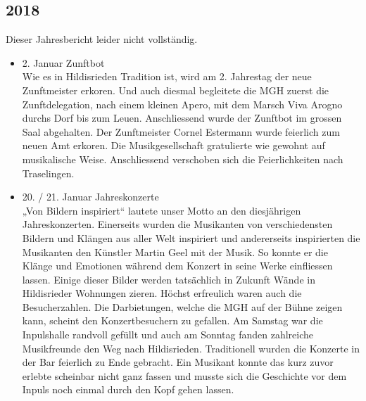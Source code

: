 \subsection*{2018}
\begin{history}

      Dieser Jahresbericht leider nicht vollständig.

      \begin{itemize}

            \item 2. Januar Zunftbot\\
                  Wie es in Hildisrieden Tradition ist, wird am 2. Jahrestag der
                  neue Zunftmeister erkoren.  Und auch diesmal begleitete die MGH
                  zuerst die Zunftdelegation, nach einem kleinen Apero, mit dem
                  Marsch Viva Arogno durchs Dorf bis zum Leuen. Anschliessend wurde
                  der Zunftbot im grossen Saal abgehalten. Der Zunftmeister Cornel
                  Estermann wurde feierlich zum neuen Amt erkoren. Die
                  Musikgesellschaft gratulierte wie gewohnt auf musikalische Weise.
                  Anschliessend verschoben sich die Feierlichkeiten nach
                  Traselingen.

            \item 20. / 21. Januar Jahreskonzerte\\
                  „Von Bildern inspiriert“ lautete unser Motto an den diesjährigen
                  Jahreskonzerten. Einerseits wurden die Musikanten von
                  verschiedensten Bildern und Klängen aus aller Welt inspiriert und
                  andererseits inspirierten die Musikanten den Künstler Martin Geel
                  mit der Musik. So konnte er die Klänge und Emotionen während dem
                  Konzert in seine Werke einfliessen lassen. Einige dieser Bilder
                  werden tatsächlich in Zukunft Wände in Hildisrieder Wohnungen
                  zieren. Höchst erfreulich waren auch die Besucherzahlen. Die
                  Darbietungen, welche die MGH auf der Bühne zeigen kann, scheint
                  den Konzertbesuchern zu gefallen. Am Samstag war die Inpulshalle
                  randvoll gefüllt und auch am Sonntag fanden zahlreiche
                  Musikfreunde den Weg nach Hildisrieden. Traditionell wurden die
                  Konzerte in der Bar feierlich zu Ende gebracht. Ein Musikant
                  konnte das kurz zuvor erlebte scheinbar nicht ganz fassen und
                  musste sich die Geschichte vor dem Inpuls noch einmal durch den
                  Kopf gehen lassen.


\end{itemize}
\end{history}
